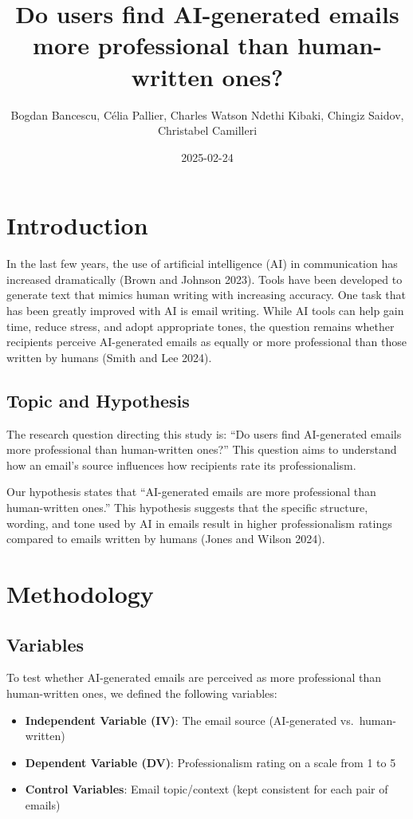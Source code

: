 \documentclass[
  letterpaper,
  DIV=11,
  numbers=noendperiod]{scrartcl}
\title{Do users find AI-generated emails more professional than
human-written ones?}
\author{Bogdan Bancescu, Célia Pallier, Charles Watson Ndethi Kibaki,
Chingiz Saidov, Christabel Camilleri}
\date{2025-02-24}
\providecommand{\tightlist}{%
  \setlength{\itemsep}{0pt}\setlength{\parskip}{0pt}}\usepackage{longtable,booktabs,array}
\begin{document}
\maketitle


\section{Introduction}\label{introduction}

In the last few years, the use of artificial intelligence (AI) in
communication has increased dramatically (Brown and Johnson 2023). Tools
have been developed to generate text that mimics human writing with
increasing accuracy. One task that has been greatly improved with AI is
email writing. While AI tools can help gain time, reduce stress, and
adopt appropriate tones, the question remains whether recipients
perceive AI-generated emails as equally or more professional than those
written by humans (Smith and Lee 2024).

\subsection{Topic and Hypothesis}\label{topic-and-hypothesis}

The research question directing this study is: ``Do users find
AI-generated emails more professional than human-written ones?'' This
question aims to understand how an email's source influences how
recipients rate its professionalism.

Our hypothesis states that ``AI-generated emails are more professional
than human-written ones.'' This hypothesis suggests that the specific
structure, wording, and tone used by AI in emails result in higher
professionalism ratings compared to emails written by humans (Jones and
Wilson 2024).

\section{Methodology}\label{methodology}

\subsection{Variables}\label{variables}

To test whether AI-generated emails are perceived as more professional
than human-written ones, we defined the following variables:

\begin{itemize}
\tightlist
\item
  \textbf{Independent Variable (IV)}: The email source (AI-generated
  vs.~human-written)
\item
  \textbf{Dependent Variable (DV)}: Professionalism rating on a scale
  from 1 to 5
\item
  \textbf{Control Variables}: Email topic/context (kept consistent for
  each pair of emails)
\end{itemize}
\end{document}
